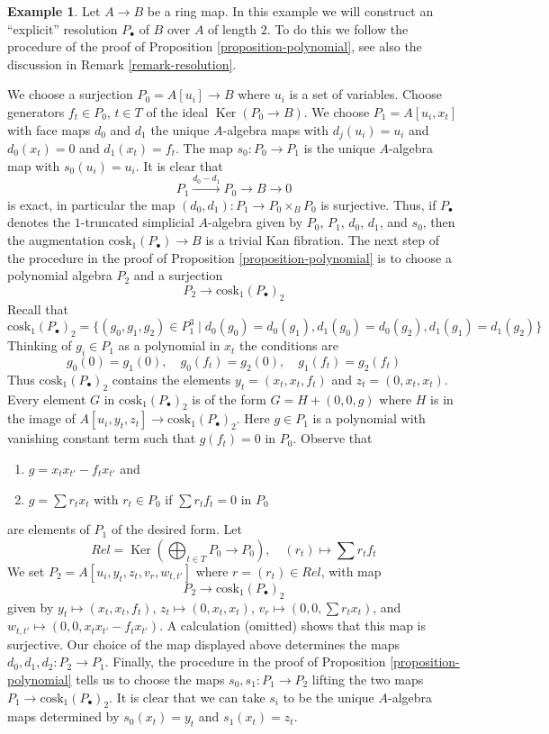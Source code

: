 \documentclass[10pt,a4paper]{amsart}
\theoremstyle{plain}
\theoremstyle{definition}
\newtheorem{example}[subsection]{Example}
\theoremstyle{remark}
\numberwithin{equation}{subsection}
\def\Ker{\mathop{\mathrm{Ker}}}
\begin{document}
\begin{example}
\label{example-resolution-length-two}
Let $A \to B$ be a ring map. In this example we 
will construct an ``explicit'' resolution $P_\bullet$ of $B$ over $A$ of
length $2$. To do this we follow the procedure of the proof of
Proposition \ref{proposition-polynomial}, see also the discussion in
Remark \ref{remark-resolution}.

\medskip\noindent
We choose a surjection $P_0 = A[u_i] \to B$ where $u_i$ is a set of
variables. Choose generators $f_t \in P_0$, $t \in T$ of the ideal
$\Ker(P_0 \to B)$. We choose $P_1 = A[u_i, x_t]$ with face maps
$d_0$ and $d_1$ the unique $A$-algebra maps with $d_j(u_i) = u_i$
and $d_0(x_t) = 0$ and $d_1(x_t) = f_t$. The map $s_0 : P_0 \to P_1$
is the unique $A$-algebra map with $s_0(u_i) = u_i$. It is clear that
$$
P_1 \xrightarrow{d_0 - d_1} P_0 \to B \to 0
$$
is exact, in particular the map $(d_0, d_1) : P_1 \to P_0 \times_B P_0$
is surjective. Thus, if $P_\bullet$ denotes the $1$-truncated
simplicial $A$-algebra given by $P_0$, $P_1$, $d_0$, $d_1$, and $s_0$, then
the augmentation $\text{cosk}_1(P_\bullet) \to B$ is a trivial Kan fibration.
The next step of the procedure in the proof of
Proposition \ref{proposition-polynomial}
is to choose a polynomial algebra $P_2$ and a surjection
$$
P_2 \longrightarrow \text{cosk}_1(P_\bullet)_2
$$
Recall that
$$
\text{cosk}_1(P_\bullet)_2 =
\{(g_0, g_1, g_2) \in P_1^3 \mid d_0(g_0) = d_0(g_1),
d_1(g_0) = d_0(g_2), d_1(g_1) = d_1(g_2)\}
$$
Thinking of $g_i \in P_1$ as a polynomial in $x_t$ the conditions
are
$$
g_0(0) = g_1(0),\quad
g_0(f_t) = g_2(0),\quad
g_1(f_t) = g_2(f_t)
$$
Thus $\text{cosk}_1(P_\bullet)_2$ contains the elements
$y_t = (x_t, x_t, f_t)$ and $z_t = (0, x_t, x_t)$.
Every element $G$ in $\text{cosk}_1(P_\bullet)_2$ is
of the form $G = H + (0, 0, g)$ where $H$ is in the image
of $A[u_i, y_t, z_t] \to \text{cosk}_1(P_\bullet)_2$. Here
$g \in P_1$ is a polynomial with vanishing
constant term such that $g(f_t) = 0$ in $P_0$. Observe that
\begin{enumerate}
\item $g = x_t x_{t'} - f_t x_{t'}$ and
\item $g = \sum r_t x_t$ with $r_t \in P_0$ if $\sum r_t f_t = 0$ in $P_0$
\end{enumerate}
are elements of $P_1$ of the desired form. Let
$$
Rel = \Ker(\bigoplus\nolimits_{t \in T} P_0 \longrightarrow P_0),\quad
(r_t) \longmapsto \sum r_tf_t
$$
We set $P_2 = A[u_i, y_t, z_t, v_r, w_{t, t'}]$ where
$r = (r_t) \in Rel$, with map
$$
P_2 \longrightarrow \text{cosk}_1(P_\bullet)_2
$$
given by $y_t  \mapsto (x_t, x_t, f_t)$,
$z_t \mapsto (0, x_t, x_t)$,
$v_r \mapsto (0, 0, \sum r_t x_t)$, and
$w_{t, t'} \mapsto (0, 0, x_t x_{t'} - f_t x_{t'})$. A calculation
(omitted) shows that this map is surjective. Our choice of the
map displayed above determines the maps $d_0, d_1, d_2 : P_2 \to P_1$.
Finally, the procedure in the proof of
Proposition \ref{proposition-polynomial}
tells us to choose the maps $s_0, s_1 : P_1 \to P_2$ lifting the two
maps $P_1 \to \text{cosk}_1(P_\bullet)_2$. It is clear that we can take
$s_i$ to be the unique $A$-algebra maps determined by
$s_0(x_t) = y_t$ and $s_1(x_t) = z_t$.
\end{example}
\end{document}
